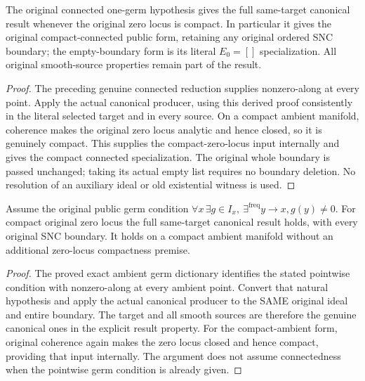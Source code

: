\begin{theorem}
\label{hir:original-principalization-connected-canonical-specialization}
The original connected one-germ hypothesis gives the full same-target
canonical result whenever the original zero locus is compact. In
particular it gives the original compact-connected public form,
retaining any original ordered SNC boundary; the empty-boundary form
is its literal $E_0=[]$ specialization. All original smooth-source
properties remain part of the result.
\leanok
\end{theorem}
\begin{proof}
The preceding genuine connected reduction supplies nonzero-along at
every point. Apply the actual canonical producer, using this derived
proof consistently in the literal selected target and in every source.
On a compact ambient manifold, coherence makes the original zero
locus analytic and hence closed, so it is genuinely compact. This
supplies the compact-zero-locus input internally and gives the compact
connected specialization. The original whole boundary is passed
unchanged; taking its actual empty list requires no boundary deletion.
No resolution of an auxiliary ideal or old existential witness is used.
\end{proof}

\begin{theorem}
\label{hir:original-principalization-germ-canonical-specializations}
Assume the original public germ condition
$\forall x\,\exists g\in I_x,\ \exists^{\mathrm{freq}}y\to x, g(y)\ne0$.
For compact original zero locus the full same-target canonical result
holds, with every original SNC boundary. It holds on a compact
ambient manifold without an additional zero-locus compactness premise.
\leanok
\end{theorem}
\begin{proof}
The proved exact ambient germ dictionary identifies the stated
pointwise condition with nonzero-along at every ambient point.
Convert that natural hypothesis and apply the actual canonical
producer to the SAME original ideal and entire boundary. The target
and all smooth sources are therefore the genuine canonical ones in
the explicit result property. For the compact-ambient form, original
coherence again makes the zero locus closed and hence compact,
providing that input internally. The argument does not assume
connectedness when the pointwise germ condition is already given.
\end{proof}

